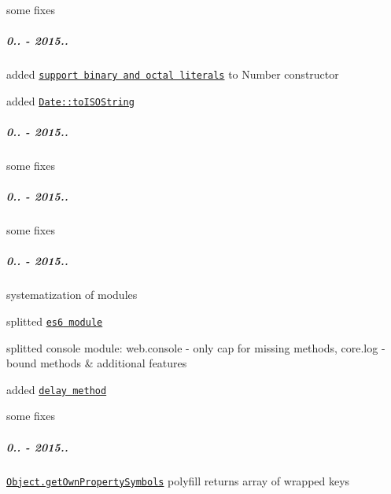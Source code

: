 \begin{DoxyItemize}
\item some fixes
\end{DoxyItemize}

\subparagraph*{0.. -\/ 2015..}


\begin{DoxyItemize}
\item added \href{https://github.com/zloirock/core-js/#ecmascript-6-number}{\tt support binary and octal literals} to {\ttfamily Number} constructor
\item added \href{https://github.com/zloirock/core-js/#ecmascript-5}{\tt {\ttfamily Date\+::to\+I\+S\+O\+String}}
\end{DoxyItemize}

\subparagraph*{0.. -\/ 2015..}


\begin{DoxyItemize}
\item some fixes
\end{DoxyItemize}

\subparagraph*{0.. -\/ 2015..}


\begin{DoxyItemize}
\item some fixes
\end{DoxyItemize}

\subparagraph*{0.. -\/ 2015..}


\begin{DoxyItemize}
\item systematization of modules
\item splitted \href{https://github.com/zloirock/core-js/#ecmascript-6}{\tt {\ttfamily es6} module}
\item splitted {\ttfamily console} module\+: {\ttfamily web.\+console} -\/ only cap for missing methods, {\ttfamily core.\+log} -\/ bound methods \& additional features
\item added \href{https://github.com/zloirock/core-js/#delay}{\tt {\ttfamily delay} method}
\item some fixes
\end{DoxyItemize}

\subparagraph*{0.. -\/ 2015..}


\begin{DoxyItemize}
\item \href{https://github.com/zloirock/core-js/#ecmascript-6-symbol}{\tt {\ttfamily Object.\+get\+Own\+Property\+Symbols}} polyfill returns array of wrapped keys
\end{DoxyItemize}

